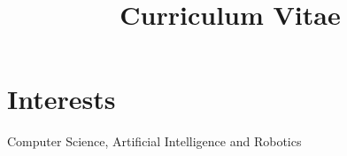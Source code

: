 \documentclass[11pt,a4paper,sans]{moderncv} %
\title{Curriculum Vitae}
\begin{document}











\makecvtitle %




\section{Interests}
Computer Science,
Artificial Intelligence
and
Robotics


\end{document}

